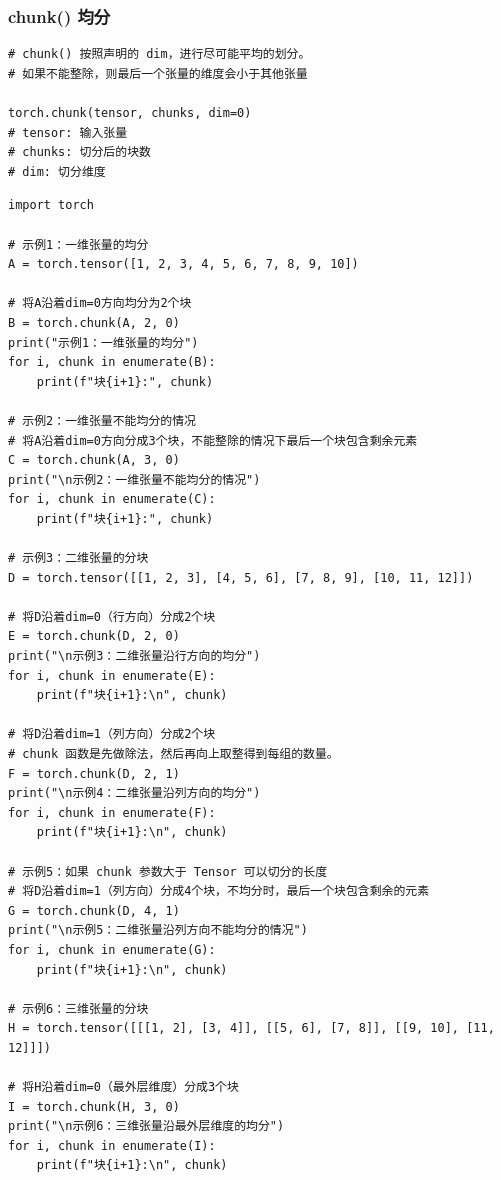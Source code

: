 \subsubsection{chunk() 均分}
\label{subsubsec:Pytorch的chunk()函数}
\begin{lstlisting}[style=demostyle,numbers=none]
# chunk() 按照声明的 dim，进行尽可能平均的划分。
# 如果不能整除，则最后一个张量的维度会小于其他张量

torch.chunk(tensor, chunks, dim=0)
# tensor: 输入张量
# chunks: 切分后的块数
# dim: 切分维度
\end{lstlisting}
\begin{lstlisting}[style=pythonstyle]
import torch

# 示例1：一维张量的均分
A = torch.tensor([1, 2, 3, 4, 5, 6, 7, 8, 9, 10])

# 将A沿着dim=0方向均分为2个块
B = torch.chunk(A, 2, 0)
print("示例1：一维张量的均分")
for i, chunk in enumerate(B):
    print(f"块{i+1}:", chunk)

# 示例2：一维张量不能均分的情况
# 将A沿着dim=0方向分成3个块，不能整除的情况下最后一个块包含剩余元素
C = torch.chunk(A, 3, 0)
print("\n示例2：一维张量不能均分的情况")
for i, chunk in enumerate(C):
    print(f"块{i+1}:", chunk)

# 示例3：二维张量的分块
D = torch.tensor([[1, 2, 3], [4, 5, 6], [7, 8, 9], [10, 11, 12]])

# 将D沿着dim=0（行方向）分成2个块
E = torch.chunk(D, 2, 0)
print("\n示例3：二维张量沿行方向的均分")
for i, chunk in enumerate(E):
    print(f"块{i+1}:\n", chunk)

# 将D沿着dim=1（列方向）分成2个块
# chunk 函数是先做除法，然后再向上取整得到每组的数量。
F = torch.chunk(D, 2, 1)
print("\n示例4：二维张量沿列方向的均分")
for i, chunk in enumerate(F):
    print(f"块{i+1}:\n", chunk)

# 示例5：如果 chunk 参数大于 Tensor 可以切分的长度
# 将D沿着dim=1（列方向）分成4个块，不均分时，最后一个块包含剩余的元素
G = torch.chunk(D, 4, 1)
print("\n示例5：二维张量沿列方向不能均分的情况")
for i, chunk in enumerate(G):
    print(f"块{i+1}:\n", chunk)

# 示例6：三维张量的分块
H = torch.tensor([[[1, 2], [3, 4]], [[5, 6], [7, 8]], [[9, 10], [11, 12]]])

# 将H沿着dim=0（最外层维度）分成3个块
I = torch.chunk(H, 3, 0)
print("\n示例6：三维张量沿最外层维度的均分")
for i, chunk in enumerate(I):
    print(f"块{i+1}:\n", chunk)
\end{lstlisting}
